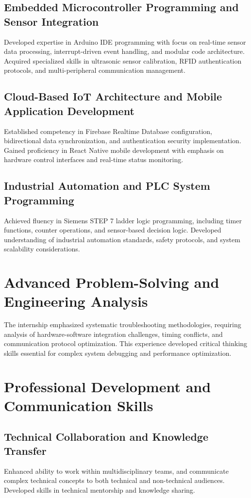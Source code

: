 \documentclass[12pt,a4paper]{report}
\begin{document}
\subsection{Embedded Microcontroller Programming and Sensor Integration}
\noindent Developed expertise in Arduino IDE programming with focus on real-time sensor data processing, interrupt-driven event handling, and modular code architecture. Acquired specialized skills in ultrasonic sensor calibration, RFID authentication protocols, and multi-peripheral communication management.

\subsection{Cloud-Based IoT Architecture and Mobile Application Development}
\noindent Established competency in Firebase Realtime Database configuration, bidirectional data synchronization, and authentication security implementation. Gained proficiency in React Native mobile development with emphasis on hardware control interfaces and real-time status monitoring.

\newpage
\subsection{Industrial Automation and PLC System Programming}
\noindent Achieved fluency in Siemens STEP 7 ladder logic programming, including timer functions, counter operations, and sensor-based decision logic. Developed understanding of industrial automation standards, safety protocols, and system scalability considerations.

\section{Advanced Problem-Solving and Engineering Analysis}

\noindent The internship emphasized systematic troubleshooting methodologies, requiring analysis of hardware-software integration challenges, timing conflicts, and communication protocol optimization. This experience developed critical thinking skills essential for complex system debugging and performance optimization.

\section{Professional Development and Communication Skills}

\subsection{Technical Collaboration and Knowledge Transfer}
\noindent Enhanced ability to work within multidisciplinary teams, and communicate complex technical concepts to both technical and non-technical audiences. Developed skills in technical mentorship and knowledge sharing.
\end{document}
